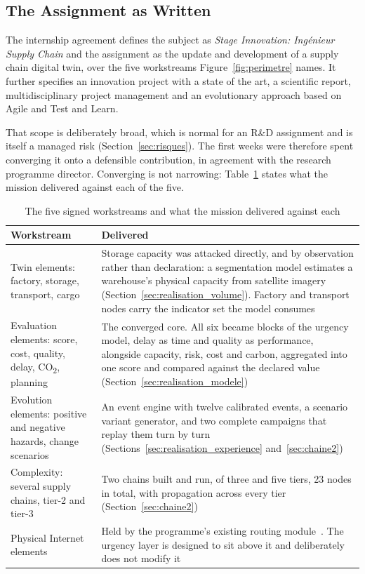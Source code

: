 
\subsection{The Assignment as Written}
\label{sec:mission_ecrite}

The internship agreement defines the subject as \emph{Stage Innovation: Ing\'enieur Supply
Chain} and the assignment as the update and development of a supply chain digital twin, over
the five workstreams Figure~\ref{fig:perimetre} names. It further specifies an innovation
project with a state of the art, a scientific report, multidisciplinary project management and
an evolutionary approach based on Agile and Test and Learn.

That scope is deliberately broad, which is normal for an R\&D assignment and is itself a
managed risk (Section~\ref{sec:risques}). The first weeks were therefore spent converging it
onto a defensible contribution, in agreement with the research programme director. Converging
is not narrowing: Table~\ref{tab:perimetre} states what the mission delivered against each of
the five.

\begin{table}[htbp]
\centering
\caption{The five signed workstreams and what the mission delivered against each}
\label{tab:perimetre}
\small
\begin{tabularx}{\linewidth}{>{\raggedright\arraybackslash}p{4.1cm} X}
\toprule
\textbf{Workstream} & \textbf{Delivered} \\
\midrule
Twin elements: factory, storage, transport, cargo & Storage capacity was attacked directly,
and by observation rather than declaration: a segmentation model estimates a warehouse's
physical capacity from satellite imagery (Section~\ref{sec:realisation_volume}). Factory and
transport nodes carry the indicator set the model consumes \\
Evaluation elements: score, cost, quality, delay, CO\textsubscript{2}, planning & The
converged core. All six became blocks of the urgency model, delay as time and quality as
performance, alongside capacity, risk, cost and carbon, aggregated into one score and
compared against the declared value (Section~\ref{sec:realisation_modele}) \\
Evolution elements: positive and negative hazards, change scenarios & An event engine with
twelve calibrated events, a scenario variant generator, and two complete campaigns that
replay them turn by turn (Sections~\ref{sec:realisation_experience} and~\ref{sec:chaine2}) \\
Complexity: several supply chains, tier-2 and tier-3 & Two chains built and run, of three and
five tiers, 23 nodes in total, with propagation across every tier
(Section~\ref{sec:chaine2}) \\
Physical Internet elements & Held by the programme's existing routing
module~\autocite{baulain2024internet}. The urgency layer is designed to sit above it and
deliberately does not modify it \\
\bottomrule
\end{tabularx}
\end{table}

